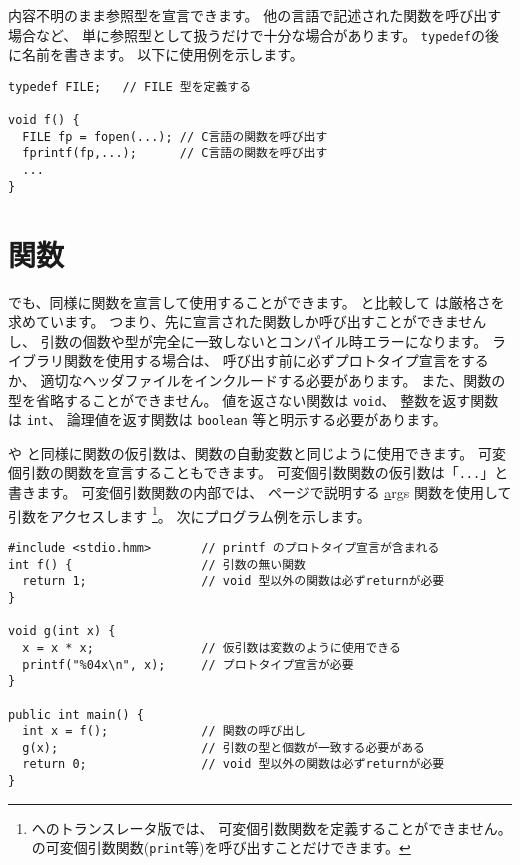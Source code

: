 内容不明のまま参照型を宣言できます。
他の言語で記述された関数を呼び出す場合など、
単に参照型として扱うだけで十分な場合があります。
\verb/typedef/の後に名前を書きます。
以下に使用例を示します。

\begin{mylist}
\begin{verbatim}
typedef FILE;   // FILE 型を定義する

void f() {
  FILE fp = fopen(...); // C言語の関数を呼び出す
  fprintf(fp,...);      // C言語の関数を呼び出す
  ...
}
\end{verbatim}
\end{mylist}

\section{関数}
\label{chap3:func}
\cmml でも、\cl 同様に関数を宣言して使用することができます。
\cl と比較して \cmml は厳格さを求めています。
つまり、先に宣言された関数しか呼び出すことができませんし、
引数の個数や型が完全に一致しないとコンパイル時エラーになります。
ライブラリ関数を使用する場合は、
呼び出す前に必ずプロトタイプ宣言をするか、
適切なヘッダファイルをインクルードする必要があります。
また、関数の型を省略することができません。
値を返さない関数は \verb/void/、
整数を返す関数は \verb/int/、
論理値を返す関数は \verb/boolean/ 等と明示する必要があります。

\cl や \javal と同様に関数の仮引数は、関数の自動変数と同じように使用できます。
可変個引数の関数を宣言することもできます。
可変個引数関数の仮引数は「\verb/.../」と書きます。
可変個引数関数の内部では、
\pageref{chap4:args}ページで説明する
\ul args 関数を使用して引数をアクセスします
\footnote{\cl へのトランスレータ版では、
可変個引数関数を定義することができません。
\cl の可変個引数関数(\verb/print/等)を呼び出すことだけできます。}。
次にプログラム例を示します。

\begin{mylist}
\begin{verbatim}
#include <stdio.hmm>       // printf のプロトタイプ宣言が含まれる
int f() {                  // 引数の無い関数
  return 1;                // void 型以外の関数は必ずreturnが必要
}

void g(int x) {
  x = x * x;               // 仮引数は変数のように使用できる
  printf("%04x\n", x);     // プロトタイプ宣言が必要
}

public int main() {
  int x = f();             // 関数の呼び出し
  g(x);                    // 引数の型と個数が一致する必要がある
  return 0;                // void 型以外の関数は必ずreturnが必要
}
\end{verbatim}
\end{mylist}

